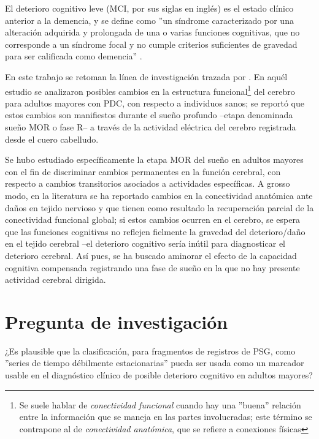 \documentclass[12pt,a4paper]{mitthesis}
\begin{document}
El deterioro cognitivo leve (MCI, por sus siglas en ingl\'es) es el estado cl\'inico anterior a la
demencia, y se define como ''un s\'indrome caracterizado por una alteraci\'on adquirida y 
prolongada de una o varias funciones cognitivas, que no corresponde a un s\'indrome focal y no 
cumple criterios suficientes de gravedad para ser calificada como demencia'' \cite{Robles02}.

En este trabajo se retoman %
la l\'inea de investigaci\'on trazada por \cite{VazquezTagle16}.
En aqu\'el estudio se analizaron
posibles cambios en la estructura funcional\footnote{Se suele hablar de 
\textit{conectividad funcional} cuando hay una ''buena'' relaci\'on entre la informaci\'on
que se maneja en las partes involucradas; este t\'ermino se contrapone al de
\textit{conectividad anat\'omica}, que se refiere a conexiones f\'isicas}
del cerebro para adultos mayores con PDC, con 
respecto a individuos sanos; se report\'o que estos cambios son manifiestos durante el sue\~no
profundo --etapa denominada sue\~no MOR o fase R-- 
a trav\'es de la actividad el\'ectrica del cerebro registrada desde el cuero 
cabelludo. 

Se hubo estudiado espec\'ificamente la etapa MOR del sue\~no en adultos mayores
con el fin de discriminar
cambios permanentes en la funci\'on cerebral, con respecto a cambios transitorios asociados
a actividades espec\'ificas.
A grosso modo, en la literatura se ha reportado cambios en la conectividad anat\'omica
ante da\~nos en tejido nervioso y que tienen como resultado la recuperaci\'on parcial
de la conectividad funcional global; si estos cambios ocurren en el cerebro, se espera que las
funciones cognitivas no reflejen fielmente la gravedad del deterioro/da\~no en el tejido cerebral
--el deterioro cognitivo ser\'ia in\'util para diagnosticar el deterioro cerebral.
As\'i pues, se ha buscado aminorar el efecto de la capacidad cognitiva compensada
registrando una fase de sue\~no en la que no hay presente actividad cerebral 
dirigida.


\section{Pregunta de investigaci\'on}

¿Es plausible que la clasificaci\'on, para fragmentos de registros de PSG, como ''series de tiempo 
d\'ebilmente estacionarias'' pueda ser usada como un marcador usable en el diagn\'ostico cl\'inico
de posible deterioro cognitivo en adultos mayores?
\end{document}
